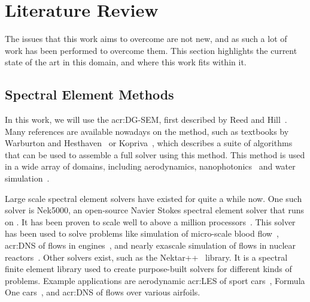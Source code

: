 \chapter{Literature Review}\label{chapter:literature_review} 

The issues that this work aims to overcome are not new, and as such a lot of work has been performed
to overcome them. This section highlights the current state of the art in this domain, and where
this work fits within it.

\section{Spectral Element Methods}\label{section:literature_review:sem}

In this work, we will use the \acrfull{acr:DG-SEM}, first described by Reed and
Hill~\cite{Reed1973}. Many references are available nowadays on the method, such as textbooks by
Warburton and Hesthaven~\cite{Hesthaven2007} or Kopriva~\cite{Kopriva2009}, which describes a suite
of algorithms that can be used to assemble a full solver using this method. This method is used in a
wide array of domains, including aerodynamics, nanophotonics~\cite{Busch2011} and water
simulation~\cite{Gassner2016}.

Large scale spectral element solvers have existed for quite a while now. One such solver is Nek5000,
an open-source Navier Stokes spectral element solver that runs on . It has been
proven to scale well to above a million processors~\cite{Offermans2017}. This solver has been used
to solve problems like simulation of micro-scale blood flow~\cite{Obabko2017}, \acrfull{acr:DNS} of
flows in engines~\cite{Ameen2020}, and nearly exascale simulation of flows in nuclear
reactors~\cite{Merzari2020}. Other solvers exist, such as the Nektar++~\cite{Cantwell2015} library.
It is a spectral finite element library used to create purpose-built solvers for different kinds of
problems. Example applications are aerodynamic \acrfull{acr:LES} of sport cars~\cite{Mengaldo2020},
Formula One cars~\cite{Cantwell2015}, and \acrshort{acr:DNS} of flows over various airfoils.

